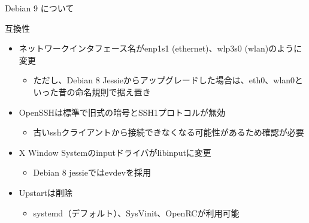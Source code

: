 \begin{frame}{Debian 9 について}%

互換性
\begin{itemize}
\item ネットワークインタフェース名がenp1s1 (ethernet)、wlp3s0 (wlan)のように変更
  \begin{itemize}
  \item ただし、Debian 8 Jessieからアップグレードした場合は、eth0、wlan0といった昔の命名規則で据え置き
  \end{itemize}
\item OpenSSHは標準で旧式の暗号とSSH1プロトコルが無効
  \begin{itemize}
  \item 古いsshクライアントから接続できなくなる可能性があるため確認が必要
  \end{itemize}
\item X Window Systemのinputドライバがlibinputに変更
  \begin{itemize}
  \item Debian 8 jessieではevdevを採用
  \end{itemize}
\item Upstartは削除
  \begin{itemize}
  \item systemd（デフォルト）、SysVinit、OpenRCが利用可能
  \end{itemize}
\end{itemize}

\end{frame}


